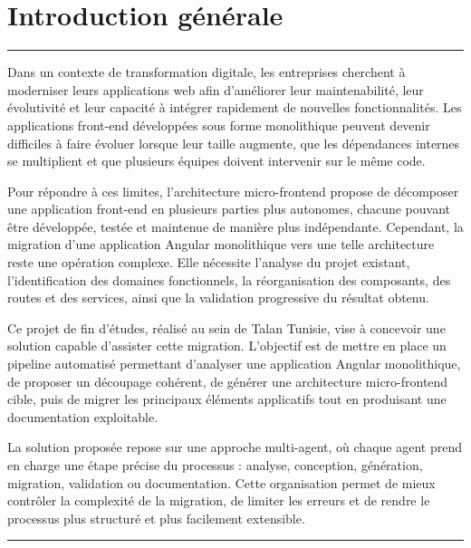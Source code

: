 \chapter*{Introduction générale}

\noindent\rule{\linewidth}{1pt}
\vspace{0.3cm}

Dans un contexte de transformation digitale, les entreprises cherchent à moderniser leurs applications web afin d'améliorer leur maintenabilité, leur évolutivité et leur capacité à intégrer rapidement de nouvelles fonctionnalités. Les applications front-end développées sous forme monolithique peuvent devenir difficiles à faire évoluer lorsque leur taille augmente, que les dépendances internes se multiplient et que plusieurs équipes doivent intervenir sur le même code.

\medskip

Pour répondre à ces limites, l'architecture micro-frontend propose de décomposer une application front-end en plusieurs parties plus autonomes, chacune pouvant être développée, testée et maintenue de manière plus indépendante. Cependant, la migration d'une application Angular monolithique vers une telle architecture reste une opération complexe. Elle nécessite l'analyse du projet existant, l'identification des domaines fonctionnels, la réorganisation des composants, des routes et des services, ainsi que la validation progressive du résultat obtenu.

\medskip

Ce projet de fin d'études, réalisé au sein de Talan Tunisie, vise à concevoir une solution capable d'assister cette migration. L'objectif est de mettre en place un pipeline automatisé permettant d'analyser une application Angular monolithique, de proposer un découpage cohérent, de générer une architecture micro-frontend cible, puis de migrer les principaux éléments applicatifs tout en produisant une documentation exploitable.

\medskip

La solution proposée repose sur une approche multi-agent, où chaque agent prend en charge une étape précise du processus : analyse, conception, génération, migration, validation ou documentation. Cette organisation permet de mieux contrôler la complexité de la migration, de limiter les erreurs et de rendre le processus plus structuré et plus facilement extensible.

\vspace{0.6cm}
\noindent\rule{\linewidth}{0.4pt}
\vspace{0.2cm}

